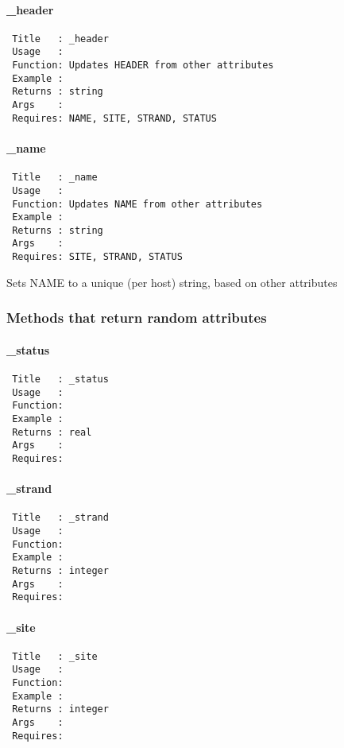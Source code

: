 \paragraph*{\_header\label{_header}}
\begin{verbatim}
 Title   : _header
 Usage   : 
 Function: Updates HEADER from other attributes
 Example : 
 Returns : string
 Args    : 
 Requires: NAME, SITE, STRAND, STATUS
\end{verbatim}
\paragraph*{\_name\label{_name}}
\begin{verbatim}
 Title   : _name
 Usage   : 
 Function: Updates NAME from other attributes
 Example : 
 Returns : string
 Args    : 
 Requires: SITE, STRAND, STATUS
\end{verbatim}


Sets NAME to a unique (per host) string, based on other attributes

\subsubsection*{Methods that return random attributes\label{Methods_that_return_random_attributes}}
\paragraph*{\_status\label{_status}}
\begin{verbatim}
 Title   : _status
 Usage   : 
 Function: 
 Example : 
 Returns : real
 Args    : 
 Requires:
\end{verbatim}
\paragraph*{\_strand\label{_strand}}
\begin{verbatim}
 Title   : _strand
 Usage   : 
 Function: 
 Example : 
 Returns : integer
 Args    : 
 Requires:
\end{verbatim}
\paragraph*{\_site\label{_site}}
\begin{verbatim}
 Title   : _site
 Usage   : 
 Function: 
 Example : 
 Returns : integer
 Args    : 
 Requires:
\end{verbatim}
